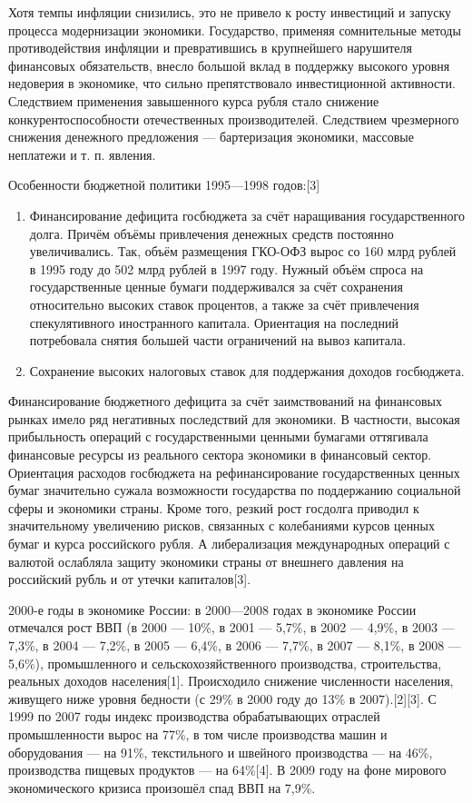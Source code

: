 \documentclass{article}
\begin{document}
Хотя темпы инфляции снизились, это не привело к росту инвестиций и запуску процесса модернизации экономики. Государство, применяя сомнительные методы противодействия инфляции и превратившись в крупнейшего нарушителя финансовых обязательств, внесло большой вклад в поддержку высокого уровня недоверия в экономике, что сильно препятствовало инвестиционной активности. Следствием применения завышенного курса рубля стало снижение конкурентоспособности отечественных производителей. Следствием чрезмерного снижения денежного предложения — бартеризация экономики, массовые неплатежи и т. п. явления.

\hfill

Особенности бюджетной политики 1995—1998 годов:[3]

\begin{enumerate}
    \item Финансирование дефицита госбюджета за счёт наращивания государственного долга. Причём объёмы привлечения денежных средств постоянно увеличивались. Так, объём размещения ГКО-ОФЗ вырос со 160 млрд рублей в 1995 году до 502 млрд рублей в 1997 году. Нужный объём спроса на государственные ценные бумаги поддерживался за счёт сохранения относительно высоких ставок процентов, а также за счёт привлечения спекулятивного иностранного капитала. Ориентация на последний потребовала снятия большей части ограничений на вывоз капитала.
    \item Сохранение высоких налоговых ставок для поддержания доходов госбюджета.
\end{enumerate}

Финансирование бюджетного дефицита за счёт заимствований на финансовых рынках имело ряд негативных последствий для экономики. В частности, высокая прибыльность операций с государственными ценными бумагами оттягивала финансовые ресурсы из реального сектора экономики в финансовый сектор. Ориентация расходов госбюджета на рефинансирование государственных ценных бумаг значительно сужала возможности государства по поддержанию социальной сферы и экономики страны. Кроме того, резкий рост госдолга приводил к значительному увеличению рисков, связанных с колебаниями курсов ценных бумаг и курса российского рубля. А либерализация международных операций с валютой ослабляла защиту экономики страны от внешнего давления на российский рубль и от утечки капиталов[3].

\hfill

2000-е годы в экономике России: в 2000—2008 годах в экономике России отмечался рост ВВП (в 2000 — 10\%, в 2001 — 5,7\%, в 2002 — 4,9\%, в 2003 — 7,3\%, в 2004 — 7,2\%, в 2005 — 6,4\%, в 2006 — 7,7\%, в 2007 — 8,1\%, в 2008 — 5,6\%), промышленного и сельскохозяйственного производства, строительства, реальных доходов населения[1]. Происходило снижение численности населения, живущего ниже уровня бедности (с 29\% в 2000 году до 13\% в 2007).[2][3]. С 1999 по 2007 годы индекс производства обрабатывающих отраслей промышленности вырос на 77\%, в том числе производства машин и оборудования — на 91\%, текстильного и швейного производства — на 46\%, производства пищевых продуктов — на 64\%[4]. В 2009 году на фоне мирового экономического кризиса произошёл спад ВВП на 7,9\%.
\end{document}

